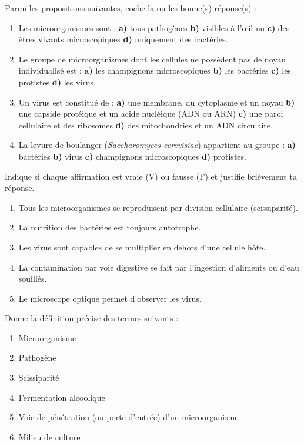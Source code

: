 \documentclass[11pt]{article}
\begin{document}
\begin{exercice}
Parmi les propositions suivantes, coche la ou les bonne(s) réponse(s) :
\begin{enumerate}
\item Les microorganismes sont : \textbf{a)} tous pathogènes \textbf{b)} visibles à l'œil nu \textbf{c)} des êtres vivants microscopiques \textbf{d)} uniquement des bactéries.
\item Le groupe de microorganismes dont les cellules ne possèdent pas de noyau individualisé est : \textbf{a)} les champignons microscopiques \textbf{b)} les bactéries \textbf{c)} les protistes \textbf{d)} les virus.
\item Un virus est constitué de : \textbf{a)} une membrane, du cytoplasme et un noyau \textbf{b)} une capside protéique et un acide nucléique (ADN ou ARN) \textbf{c)} une paroi cellulaire et des ribosomes \textbf{d)} des mitochondries et un ADN circulaire.
\item La levure de boulanger (\emph{Saccharomyces cerevisiae}) appartient au groupe : \textbf{a)} bactéries \textbf{b)} virus \textbf{c)} champignons microscopiques \textbf{d)} protistes.
\end{enumerate}
\end{exercice}

\begin{exercice}
Indique si chaque affirmation est vraie (V) ou fausse (F) et justifie brièvement ta réponse.
\begin{enumerate}
\item Tous les microorganismes se reproduisent par division cellulaire (scissiparité).
\item La nutrition des bactéries est toujours autotrophe.
\item Les virus sont capables de se multiplier en dehors d'une cellule hôte.
\item La contamination par voie digestive se fait par l'ingestion d'aliments ou d'eau souillés.
\item Le microscope optique permet d'observer les virus.
\end{enumerate}
\end{exercice}

\begin{exercice}
Donne la définition précise des termes suivants :
\begin{enumerate}
\item Microorganisme
\item Pathogène
\item Scissiparité
\item Fermentation alcoolique
\item Voie de pénétration (ou porte d'entrée) d'un microorganisme
\item Milieu de culture
\end{enumerate}
\end{exercice}
\end{document}
